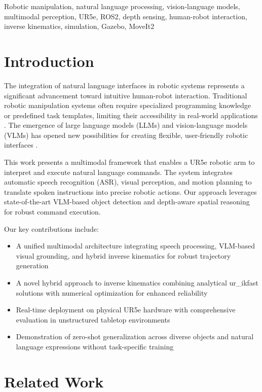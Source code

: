 \documentclass[conference]{IEEEtran}
\begin{document}
\begin{IEEEkeywords}
Robotic manipulation, natural language processing, vision-language models, multimodal perception, UR5e, ROS2, depth sensing, human-robot interaction, inverse kinematics, simulation, Gazebo, MoveIt2
\end{IEEEkeywords}

\section{Introduction}
The integration of natural language interfaces in robotic systems represents a significant advancement toward intuitive human-robot interaction. Traditional robotic manipulation systems often require specialized programming knowledge or predefined task templates, limiting their accessibility in real-world applications \cite{billard2019trends}. The emergence of large language models (LLMs) and vision-language models (VLMs) has opened new possibilities for creating flexible, user-friendly robotic interfaces \cite{wang2024large}. 

This work presents a multimodal framework that enables a UR5e robotic arm to interpret and execute natural language commands. The system integrates automatic speech recognition (ASR), visual perception, and motion planning to translate spoken instructions into precise robotic actions. Our approach leverages state-of-the-art VLM-based object detection and depth-aware spatial reasoning for robust command execution.

Our key contributions include:
\begin{itemize}
    \item A unified multimodal architecture integrating speech processing, VLM-based visual grounding, and hybrid inverse kinematics for robust trajectory generation
    \item A novel hybrid approach to inverse kinematics combining analytical ur\_ikfast solutions with numerical optimization for enhanced reliability
    \item Real-time deployment on physical UR5e hardware with comprehensive evaluation in unstructured tabletop environments
    \item Demonstration of zero-shot generalization across diverse objects and natural language expressions without task-specific training
\end{itemize}

\section{Related Work}
\end{document}
